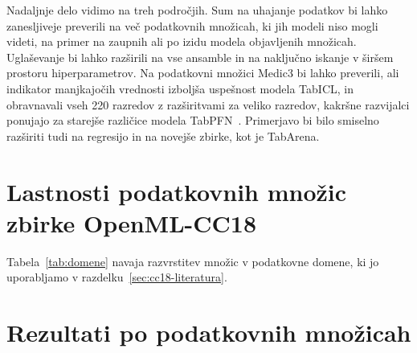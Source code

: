 \documentclass[a4paper,12pt,openright]{book}
\begin{document}
Nadaljnje delo vidimo na treh področjih. Sum na uhajanje podatkov bi lahko
zanesljiveje preverili na več podatkovnih množicah, ki jih modeli niso mogli
videti, na primer na zaupnih ali po izidu modela objavljenih množicah.
Uglaševanje bi lahko razširili na vse ansamble in na naključno iskanje v širšem
prostoru hiperparametrov. Na podatkovni množici Medic3 bi lahko preverili, ali
indikator manjkajočih vrednosti izboljša uspešnost modela TabICL, in obravnavali vseh 220
razredov z razširitvami za veliko razredov, kakršne razvijalci ponujajo za
starejše različice modela TabPFN~\cite{grinsztajn2026tabpfn3}. Primerjavo bi
bilo smiselno razširiti tudi na regresijo in na novejše zbirke, kot je
TabArena.


\printbibliography[heading=bibintoc]

\appendix

\chapter{Lastnosti podatkovnih množic zbirke OpenML-CC18}
\label{dod:lastnosti}



Tabela~\ref{tab:domene} navaja razvrstitev množic v podatkovne domene, ki jo
uporabljamo v razdelku~\ref{sec:cc18-literatura}.



\chapter{Rezultati po podatkovnih množicah}
\label{dod:rezultati}


\end{document}

